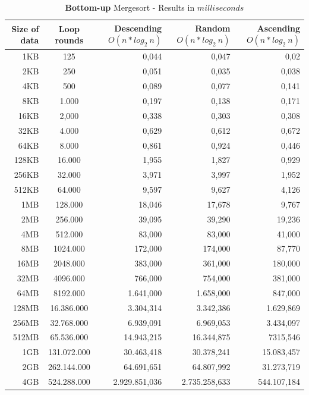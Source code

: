 \documentclass[11pt]{amsart}
\begin{document}
\clearpage
\begin{table}[htdp]
	\caption{\textbf{Bottom-up} Mergesort - Results in $milliseconds$}
	\begin{tabular}{|r|c|r|r|r|} \hline
		Size of data & Loop rounds & \parbox[c]{3.5cm}{Descending \\ $O(n*log_2~n)$} & \parbox[c]{3.5cm}{Random \\$O(n*log_2~n)$} & \parbox[c]{3.5cm}{Ascending \\ $O(n*log_2~n)$} \\ \hline	
		1KB & 125 & 0,044 & 0,047 & 0,02 \\ \hline
		2KB & 250 & 0,051 & 0,035 & 0,038 \\ \hline
		4KB & 500 & 0,089 & 0,077 & 0,141 \\ \hline
		8KB & 1.000 & 0,197 & 0,138 & 0,171 \\ \hline
		16KB & 2,000 & 0,338 & 0,303 & 0,308 \\ \hline
		32KB & 4.000 & 0,629 & 0,612 & 0,672 \\ \hline
		64KB & 8.000 & 0,861 & 0,924 & 0,446 \\ \hline
		128KB & 16.000 & 1,955 & 1,827 & 0,929 \\ \hline
		256KB & 32.000& 3,971 & 3,997 & 1,952 \\ \hline
		512KB & 64.000 & 9,597 & 9,627 & 4,126 \\ \hline
		1MB & 128.000 & 18,046 & 17,678 & 9,767 \\ \hline
		2MB & 256.000 & 39,095 & 39,290 & 19,236 \\ \hline
		4MB & 512.000 & 83,000 & 83,000 & 41,000 \\ \hline
		8MB & 1024.000 & 172,000 & 174,000 & 87,770 \\ \hline
		16MB & 2048.000 & 383,000 & 361,000 & 180,000 \\ \hline
		32MB & 4096.000 & 766,000 & 754,000 & 381,000 \\ \hline
		64MB & 8192.000 & 1.641,000 & 1.658,000 & 847,000 \\ \hline
		128MB & 16.386.000 & 3.304,314 & 3.342,386 & 1.629,869 \\ \hline
		256MB & 32.768.000 & 6.939,091 & 6.969,053 & 3.434,097 \\ \hline
		512MB & 65.536.000 & 14.943,215 & 16.344,875 & 7315,546 \\ \hline
		1GB & 131.072.000 & 30.463,418 & 30.378,241 & 15.083,457 \\ \hline
		2GB & 262.144.000 & 64.691,651 & 64.807,992 & 31.273,719 \\ \hline
		4GB & 524.288.000 & 2.929.851,036 & 2.735.258,633 & 544.107,184 \\ \hline
	\end{tabular}
	\label{default}
\end{table}%
\end{document}
